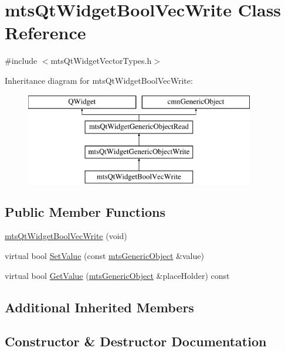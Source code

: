 \hypertarget{classmts_qt_widget_bool_vec_write}{}\section{mts\+Qt\+Widget\+Bool\+Vec\+Write Class Reference}
\label{classmts_qt_widget_bool_vec_write}


{\ttfamily \#include $<$mts\+Qt\+Widget\+Vector\+Types.\+h$>$}

Inheritance diagram for mts\+Qt\+Widget\+Bool\+Vec\+Write\+:\begin{figure}[H]
\begin{center}
\leavevmode
\includegraphics[height=4.000000cm]{d2/d55/classmts_qt_widget_bool_vec_write}
\end{center}
\end{figure}
\subsection*{Public Member Functions}
\begin{DoxyCompactItemize}
\item 
\hyperlink{classmts_qt_widget_bool_vec_write_abb767c7ec00bc53a87aed1435554a772}{mts\+Qt\+Widget\+Bool\+Vec\+Write} (void)
\item 
virtual bool \hyperlink{classmts_qt_widget_bool_vec_write_a330ae4e994be8862142e21d11310f1ca}{Set\+Value} (const \hyperlink{classmts_generic_object}{mts\+Generic\+Object} \&value)
\item 
virtual bool \hyperlink{classmts_qt_widget_bool_vec_write_a2613edf1341bd91cbf9d17084deb17fa}{Get\+Value} (\hyperlink{classmts_generic_object}{mts\+Generic\+Object} \&place\+Holder) const 
\end{DoxyCompactItemize}
\subsection*{Additional Inherited Members}


\subsection{Constructor \& Destructor Documentation}
\hypertarget{classmts_qt_widget_bool_vec_write_abb767c7ec00bc53a87aed1435554a772}{}
